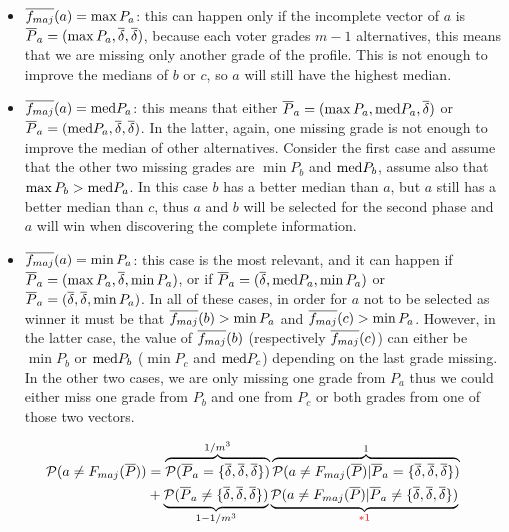 \documentclass[version=3.21, pagesize, twoside=off, bibliography=totoc, DIV=calc, fontsize=12pt, a4paper]{scrartcl}
\begin{document}
\begin{itemize}
	\item $\overline{f_{maj}}(a)= \max{P_a}$: this can happen only if the incomplete vector of $a$ is $\overline{P}_a=(\max{P_a},\overline{\delta},\overline{\delta})$, because each voter grades $m-1$ alternatives, this means that we are missing only another grade of the profile. This is not enough to improve the medians of $b$ or $c$, so $a$ will still have the highest median.
	\item $\overline{f_{maj}}(a)= \text{med}{P_a}$: this means that either $\overline{P}_a=(\max{P_a},\text{med}{P_a},\overline{\delta})$ or $\overline{P}_a=(\text{med}{P_a},\overline{\delta},\overline{\delta})$. In the latter, again, one missing grade is not enough to improve the median of other alternatives. Consider the first case and assume that the other two missing grades are $\min{P_b}$ and $\text{med}{P_b}$, assume also that $\max{P_b}>\text{med}{P_a}$. In this case $b$ has a better median than $a$, but $a$ still has a better median than $c$, thus $a$ and $b$ will be selected for the second phase and $a$ will win when discovering the complete information.
	\item $\overline{f_{maj}}(a)= \min{P_a}$: this case is the most relevant, and it can happen if $\overline{P}_a=(\max{P_a},\overline{\delta},\min{P_a})$, or if $\overline{P}_a=(\overline{\delta},\text{med}{P_a},\min{P_a})$ or $\overline{P}_a=(\overline{\delta},\overline{\delta},\min{P_a})$. In all of these cases, in order for $a$ not to be selected as winner it must be that $\overline{f_{maj}}(b)>\min{P_a}$ and  $\overline{f_{maj}}(c)>\min{P_a}$. However, in the latter case, the value of $\overline{f_{maj}}(b)$ (respectively $\overline{f_{maj}}(c)$) can either be $\min{P_b}$ or $\text{med}{P_b}$ ($\min{P_c}$ and $\text{med}{P_c}$) depending on the last grade missing. In the other two cases, we are only missing one grade from $P_a$ thus we could either miss one grade from $P_b$ and one from $P_c$ or both grades from one of those two vectors.
\end{itemize}

\begin{align}
	\mathcal{P}(a\neq F_{maj}(\overline{P})) &=\overbrace{\mathcal{P}(\overline{P}_a=\{\overline{\delta},\overline{\delta},\overline{\delta}\})}^{1/m^3} \overbrace{\mathcal{P}(a\neq F_{maj}(\overline{P})|\overline{P}_a=\{\overline{\delta},\overline{\delta},\overline{\delta}\})}^{1}\\
	&+\underbrace{\mathcal{P}(\overline{P}_a\neq\{\overline{\delta},\overline{\delta},\overline{\delta}\})}_{1-1/m^3} \underbrace{\mathcal{P}(a\neq F_{maj}(\overline{P})|\overline{P}_a\neq\{\overline{\delta},\overline{\delta},\overline{\delta}\})}_{\color{red}*1}
\end{align}
 
\end{document}
